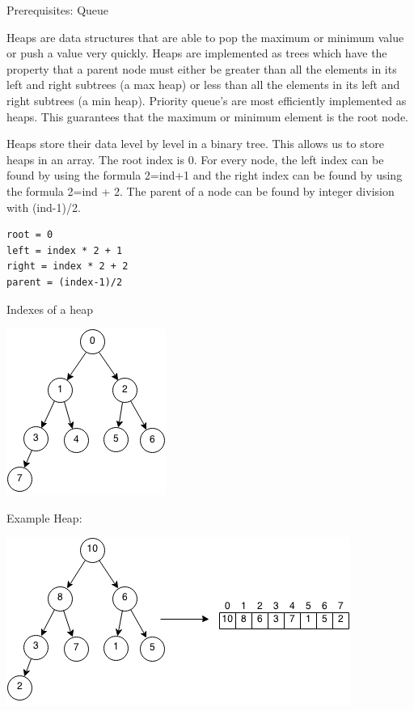 \documentclass[11pt,oneside]{book}
\makeatletter
\def\maxwidth#1{\ifdim\Gin@nat@width>#1 #1\else\Gin@nat@width\fi}
\makeatother
\begin{document}
Prerequisites: Queue



Heaps are data structures that are able to pop the maximum or minimum value or push a value very quickly. Heaps are implemented as trees which have the property that a parent node must either be greater than all the elements in its left and right subtrees (a max heap) or less than all the elements in its left and right subtrees (a min heap). Priority queue's are most efficiently implemented as heaps. This guarantees that the maximum or minimum element is the root node.

Heaps store their data level by level in a binary tree. This allows us to store heaps in an array. The root index is 0. For every node, the left index can be found by using the formula 2=ind+1 and the right index can be found by using the formula 2=ind + 2. The parent of a node can be found by integer division with (ind-1)/2.

\begin{lstlisting}
root = 0
left = index * 2 + 1
right = index * 2 + 2
parent = (index-1)/2
\end{lstlisting}

Indexes of a heap

\vspace{5px}\includegraphics[width=\maxwidth{\textwidth}]{maxheap2.png}

Example Heap:

\vspace{5px}\includegraphics[width=\maxwidth{\textwidth}]{maxheap.png}
\end{document}
